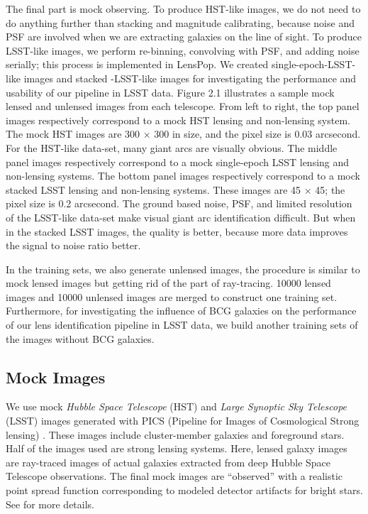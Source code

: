 \documentclass{emulateapj}
\begin{document}
The final part is mock observing. To produce HST-like images, we do
not need to do anything further than stacking and magnitude
calibrating, because noise and PSF are involved when we are extracting
galaxies on the line of sight. To produce LSST-like images, we perform
re-binning, convolving with PSF, and adding noise serially; this
process is implemented in LensPop. We created single-epoch-LSST-like
images and stacked -LSST-like images for investigating the performance
and usability of our pipeline in LSST data. Figure 2.1 illustrates a
sample mock lensed and unlensed images from each telescope. From left
to right, the top panel images respectively correspond to a mock HST
lensing and non-lensing system. The mock HST images are 300 × 300 in
size, and the pixel size is 0.03 arcsecond. For the HST-like data-set,
many giant arcs are visually obvious. The middle panel images
respectively correspond to a mock single-epoch LSST lensing and
non-lensing systems. The bottom panel images respectively correspond
to a mock stacked LSST lensing and non-lensing systems. These images
are 45 × 45; the pixel size is 0.2 arcsecond. The ground based noise,
PSF, and limited resolution of the LSST-like data-set make visual
giant arc identification difficult. But when in the stacked LSST
images, the quality is better, because more data improves the signal
to noise ratio better.


In the training sets, we also generate unlensed images, the procedure
is similar to mock lensed images but getting rid of the part of
ray-tracing. 10000 lensed images and 10000 unlensed images are merged
to construct one training set. Furthermore, for investigating the
influence of BCG galaxies on the performance of our lens
identification pipeline in LSST data, we build another training sets
of the images without BCG galaxies.

\subsection{Mock Images}

We use mock {\em Hubble Space Telescope} (HST) and {\em Large Synoptic
  Sky Telescope} (LSST) images generated with PICS (Pipeline for
Images of Cosmological Strong lensing) \citep{li_etal16}.  These
images include cluster-member galaxies and foreground stars.  Half of
the images used are strong lensing systems.  Here, lensed galaxy
images are ray-traced images of actual galaxies extracted from deep
Hubble Space Telescope observations.  The final mock images are
``observed'' with a realistic point spread function corresponding to
modeled detector artifacts for bright stars.  See \cite{li_etal16} for
more details.
\end{document}
